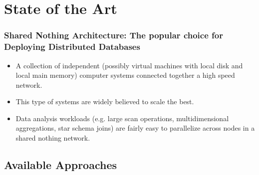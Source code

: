 \documentclass{beamer}
\begin{document}




\section{State of the Art}
\label{sec:state-of-the-art}

\begin{frame}
  \frametitle{Shared Nothing Architecture: The popular choice for
    Deploying Distributed Databases}
  \begin{itemize}
  \item A collection of independent (possibly virtual machines with local disk and local main memory) computer systems connected together a high speed network.
  \item This type of systems are widely believed to scale the best.
  \item Data analysis workloads (e.g. large scan operations, multidimensional aggregations, star schema joins) are fairly easy to parallelize across nodes  in a shared nothing network.
  \end{itemize}
\end{frame}

\subsection{Available Approaches}
\end{document}
